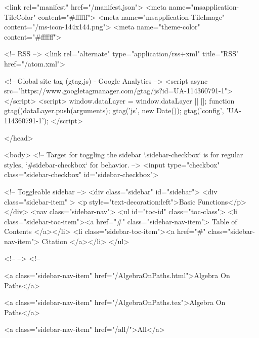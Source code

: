   <link rel="manifest" href="/manifest.json">
  <meta name="msapplication-TileColor" content="#ffffff">
  <meta name="msapplication-TileImage" content="/ms-icon-144x144.png">
  <meta name="theme-color" content="#ffffff">
  
  <!-- RSS -->
  <link rel="alternate" type="application/rss+xml" title="RSS" href="/atom.xml">

  <!-- Global site tag (gtag.js) - Google Analytics -->
  <script async src="https://www.googletagmanager.com/gtag/js?id=UA-114360791-1"></script>
  <script>
    window.dataLayer = window.dataLayer || [];
    function gtag(){dataLayer.push(arguments);}
    gtag('js', new Date());
    gtag('config', 'UA-114360791-1');
  </script>

  
</head>




  <body>
    <!-- Target for toggling the sidebar `.sidebar-checkbox` is for regular
     styles, `#sidebar-checkbox` for behavior. -->
<input type="checkbox" class="sidebar-checkbox" id="sidebar-checkbox">

<!-- Toggleable sidebar -->
<div class="sidebar" id="sidebar">
  <div class="sidebar-item" >
    <p style="text-decoration:left">Basic Functions</p>
  </div>
  <nav class="sidebar-nav">
    <ul id="toc-id" class="toc-class">
  <li class="sidebar-toc-item"><a href="#" class="sidebar-nav-item"> Table of Contents </a></li>
  <li class="sidebar-toc-item"><a href="#" class="sidebar-nav-item"> Citation </a></li>
</ul>


    <!--  -->
    <!-- 
      
    
      
    
      
    
      
        
      
    
      
        
          <a class="sidebar-nav-item" href="/AlgebraOnPaths.html">Algebra On Paths</a>
        
      
    
      
        
          <a class="sidebar-nav-item" href="/AlgebraOnPaths.tex">Algebra On Paths</a>
        
      
    
      
        
          <a class="sidebar-nav-item" href="/all/">All</a>
        
      
    
      
        

